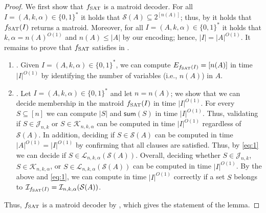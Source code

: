 \documentclass[11pt,letter]{article}
\newcommand{\cI}{{\mathcal{I}}}
\newcommand{\fs}{f_{\textnormal{SAT}}}
\newcommand{\io}{|I|^{O(1)}}
\newcommand{\cC}{{\mathcal{C}}}
\begin{document}
	\begin{proof} %
		We first show that $\fs$ is a matroid decoder. %
		For all $I = (A,k,\alpha) \in \{0,1\}^*$  it holds that $\mathcal{S}(A) \subseteq 2^{\left[n(A)\right]}$; thus, by  it holds that $f_{\textnormal{SAT}}(I)$ returns a matroid. Moreover, for all $I = (A,k,\alpha) \in \{0,1\}^*$ it holds that $k,\alpha = {n(A)}^{O(1)}$ and $n(A) \leq |A|$ by our encoding; hence, $|I| = |A|^{O(1)}$.  It remains to prove that $\fs$ satisfies  in .
		\begin{enumerate}
			\item  	{}. Given $I = (A,k,\alpha) \in \{0,1\}^*$, we can compute $E_{f_{\textnormal{SAT}}(I)} = \left[n(A)\right]$ in time $|I|^{O(1)}$ by identifying the number of variables (i.e., $n(A)$) in $A$. 
			\item 		{}. Let $I = (A,k,\alpha) \in \{0,1\}^*$ and let $n = n(A)$; we show that we can decide membership in the matroid $\fs(I)$ in time $\io$.  %
			For every $S \subseteq \left[n\right]$ we can compute $|S|$ and $\textsf{sum}(S)$ in time $|I|^{O(1)}$. Thus, validating if $S \in \mathcal{J}_{n,k}$ or $S \in \mathcal{K}_{n,k,\alpha}$ can be computed in time $\io$ regardless of $\mathcal{S}(A)$. In addition, %
			deciding if $S \in \mathcal{S}(A)$ can be computed in time $|A|^{O(1)} = |I|^{O(1)}$ by confirming that all clauses are satisfied. Thus, by \eqref{eq:1} we can decide if $S \in \mathcal{L}_{n,k,\alpha}(\mathcal{S}(A))$. Overall, deciding whether $S \in \mathcal{J}_{n,k}$, $S \in \mathcal{K}_{n,k,\alpha}$, or $S \in \mathcal{L}_{n,k,\alpha}(\mathcal{S}(A))$ can be computed in time $|I|^{O(1)}$. By the above and \eqref{eq:1}, we can compute in time $\io$ correctly if a set $S$ belongs to $\cI_{\fs (I)} = \cI_{n,k,\alpha}(\mathcal{S}(A))$. 
		\end{enumerate}
		Thus, $\fs$ is a matroid decoder by , which gives the statement of the lemma.  %
	\end{proof} 
	
\end{document}
